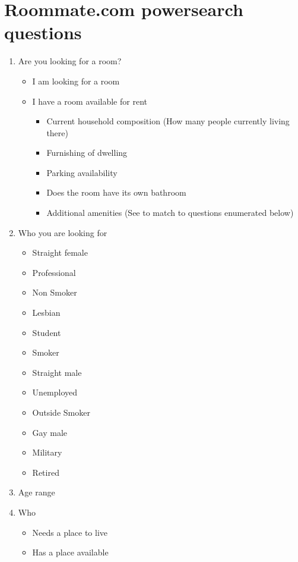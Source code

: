 \documentclass[journal]{./IEEE/IEEEtran}
\begin{document}
\newpage
\appendices
\section{Roommate.com powersearch questions} %
\begin{enumerate}
    \item Are you looking for a room?
    \begin{itemize}
        \item I am looking for a room
        \item I have a room available for rent
        \begin{itemize}
            \item Current household composition (How many people currently living there)
            \item Furnishing of dwelling
            \item Parking availability
            \item Does the room have its own bathroom
            \item Additional amenities (See to match to questions enumerated below)
        \end{itemize}
    \end{itemize}
    \item Who you are looking for
    \begin{itemize}
        \item Straight female
        \item Professional
        \item Non Smoker
        \item Lesbian
        \item Student
        \item Smoker
        \item Straight male
        \item Unemployed
        \item Outside Smoker
        \item Gay male
        \item Military
        \item Retired
    \end{itemize}
    \item Age range
    \item Who
    \begin{itemize}
        \item Needs a place to live
        \item Has a place available

\end{itemize}
\end{enumerate}
\end{document}
